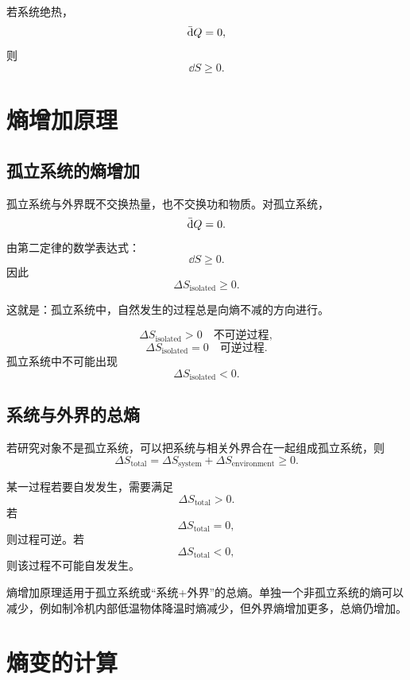 若系统绝热，
\[
  \mathop{}\!\bar{\mathrm{d}} Q=0,
\]
则
\[
  \boxed{
  \dd S\ge0.
  }
\]

\section{熵增加原理}

\subsection{孤立系统的熵增加}

孤立系统与外界既不交换热量，也不交换功和物质。对孤立系统，
\[
  \mathop{}\!\bar{\mathrm{d}} Q=0.
\]
由第二定律的数学表达式：
\[
  \dd S\ge0.
\]
因此
\[
  \boxed{
  \Delta S_{\mathrm{isolated}}\ge0.
  }
\]

这就是：孤立系统中，自然发生的过程总是向熵不减的方向进行。

\begin{FormulaBox}[熵增加原理]
\[
  \Delta S_{\mathrm{isolated}}>0
  \quad\text{不可逆过程},
\]
\[
  \Delta S_{\mathrm{isolated}}=0
  \quad\text{可逆过程}.
\]
孤立系统中不可能出现
\[
  \Delta S_{\mathrm{isolated}}<0.
\]
\end{FormulaBox}

\subsection{系统与外界的总熵}

若研究对象不是孤立系统，可以把系统与相关外界合在一起组成孤立系统，则
\[
  \Delta S_{\mathrm{total}}
  =
  \Delta S_{\mathrm{system}}+\Delta S_{\mathrm{environment}}\ge0.
\]

\begin{KeyBox}[判断过程能否自发发生]
某一过程若要自发发生，需要满足
\[
  \Delta S_{\mathrm{total}}>0.
\]
若
\[
  \Delta S_{\mathrm{total}}=0,
\]
则过程可逆。若
\[
  \Delta S_{\mathrm{total}}<0,
\]
则该过程不可能自发发生。
\end{KeyBox}

\begin{WarnBox}
熵增加原理适用于孤立系统或“系统+外界”的总熵。单独一个非孤立系统的熵可以减少，例如制冷机内部低温物体降温时熵减少，但外界熵增加更多，总熵仍增加。
\end{WarnBox}

\section{熵变的计算}

